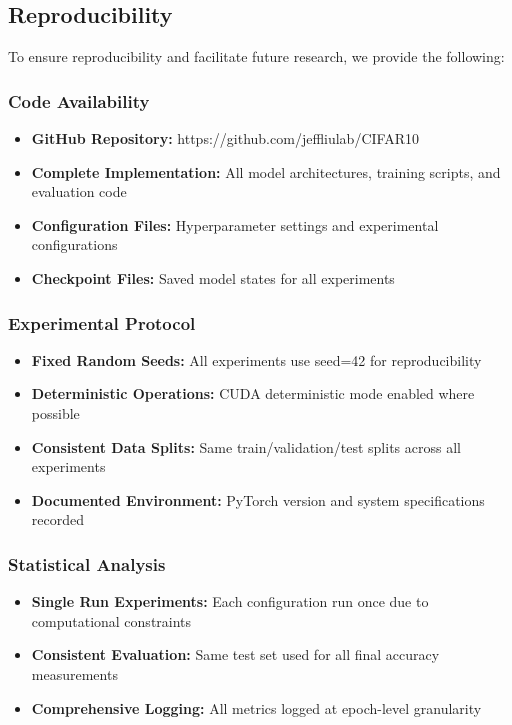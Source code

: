 \documentclass[12pt]{article}
\begin{document}
\subsection{Reproducibility}

To ensure reproducibility and facilitate future research, we provide the following:

\subsubsection{Code Availability}
\begin{itemize}
    \item \textbf{GitHub Repository:} https://github.com/jeffliulab/CIFAR10
    \item \textbf{Complete Implementation:} All model architectures, training scripts, and evaluation code
    \item \textbf{Configuration Files:} Hyperparameter settings and experimental configurations
    \item \textbf{Checkpoint Files:} Saved model states for all experiments
\end{itemize}

\subsubsection{Experimental Protocol}
\begin{itemize}
    \item \textbf{Fixed Random Seeds:} All experiments use seed=42 for reproducibility
    \item \textbf{Deterministic Operations:} CUDA deterministic mode enabled where possible
    \item \textbf{Consistent Data Splits:} Same train/validation/test splits across all experiments
    \item \textbf{Documented Environment:} PyTorch version and system specifications recorded
\end{itemize}

\subsubsection{Statistical Analysis}
\begin{itemize}
    \item \textbf{Single Run Experiments:} Each configuration run once due to computational constraints
    \item \textbf{Consistent Evaluation:} Same test set used for all final accuracy measurements
    \item \textbf{Comprehensive Logging:} All metrics logged at epoch-level granularity
\end{itemize}
\end{document}
